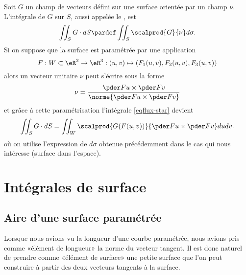 Soit $G$ un champ de vecteurs défini sur une surface orientée par un
champ $\nu$. L'intégrale de $G$ sur $S$, aussi appelée le , est
\begin{equation}\label{eqflux-star}
  \iint_S G \cdot d S \pardef \iint_S \scalprod{G}{\nu} d \sigma.
\end{equation}
Si on suppose que la surface est paramétrée par une application
\begin{equation*}
  F : W \subset \eR^2 \to \eR^3 : (u,v) \mapsto (F_1(u,v),F_2(u,v),F_3(u,v))
\end{equation*}
alors un vecteur unitaire $\nu$ peut s'écrire sous la forme
\begin{equation*}
  \nu = \frac{\pder F u \times \pder F v}{\norme{\pder F u \times \pder F v}}
\end{equation*}
et grâce à cette paramétrisation l'intégrale \eqref{eqflux-star}
devient
\begin{equation*}
  \iint_S G \cdot d S = \iint_W \scalprod{G(F(u,v))}{\pder F u \times \pder F v} d u
  d v.
\end{equation*}
où on utilise l'expression de $d \sigma$ obtenue précédemment dans le cas qui nous intéresse (surface dans l'espace).

\section{Intégrales de surface}

\subsection{Aire d'une surface paramétrée}

Lorsque nous avions vu la longueur d'une courbe paramétrée, nous avions pris comme «élément de longueur» la norme du vecteur tangent. Il est donc naturel de prendre comme «élément de surface» une petite surface que l'on peut construire à partir des deux vecteurs tangents à la surface.

